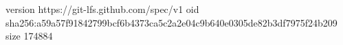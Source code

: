 version https://git-lfs.github.com/spec/v1
oid sha256:a59a57f91842799bcf6b4373ca5c2a2e04c9b640e0305de82b3df7975f24b209
size 174884
